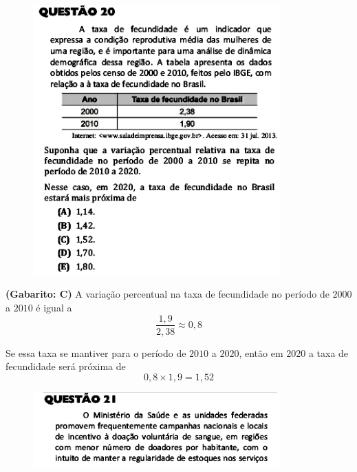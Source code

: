 \documentclass[a4paper]{article}
\begin{document}
\begin{figure}[H]
	\begin{center}
		\includegraphics[width=9.5cm]{L3Q20.png}
	\end{center}
\end{figure}
\par\textbf{(Gabarito: C)} A variação percentual na taxa de fecundidade no período de $2000$ a $2010$ é igual a 
\begin{equation*}
\frac{1,9}{2,38} \approx 0,8
\end{equation*}
\par\vspace{0.3cm} Se essa taxa se mantiver para o período de $2010$ a $2020$, então em $2020$ a taxa de fecundidade será próxima de
\begin{equation*}
0,8\times 1,9 = 1,52
\end{equation*}
\begin{figure}[H]
	\begin{center}
		\includegraphics[width=9.5cm]{L3Q21_1.png}
	\end{center}
\end{figure}
\end{document}
